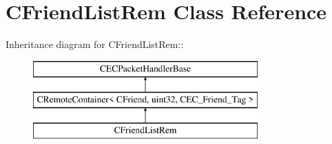 \section{CFriendListRem Class Reference}
\label{classCFriendListRem}
Inheritance diagram for CFriendListRem::\begin{figure}[H]
\begin{center}
\leavevmode
\includegraphics[height=3cm]{classCFriendListRem}
\end{center}
\end{figure}
